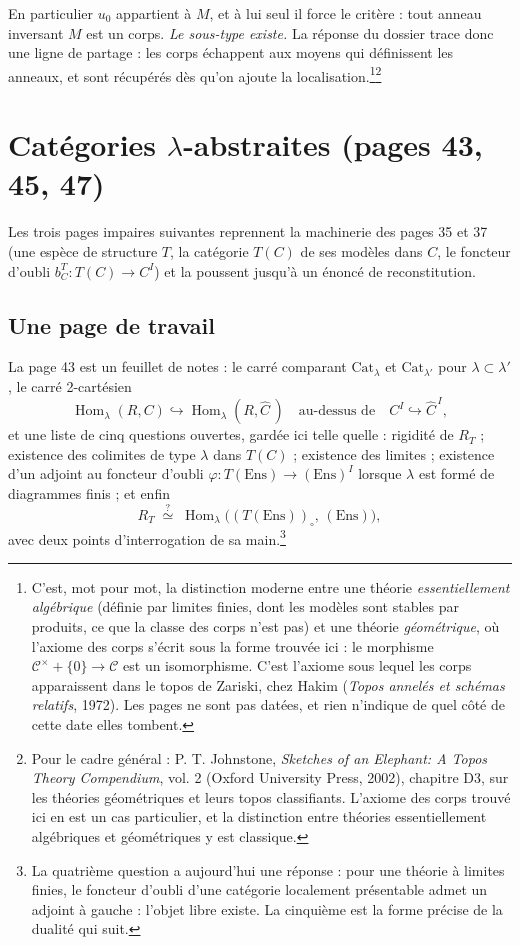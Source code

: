 \documentclass[11pt,a4paper]{article}
\begin{document}
En particulier $u_{0}$ appartient à $M$, et à lui seul il force le critère :
tout anneau inversant $M$ est un corps. \emph{Le sous-type existe.} La réponse
du dossier trace donc une ligne de partage : les corps
échappent aux moyens qui définissent les anneaux, et sont récupérés dès qu'on
ajoute la localisation.\footnote{C'est, mot pour mot, la distinction moderne
entre une théorie \emph{essentiellement algébrique} (définie par limites
finies, dont les modèles sont stables par produits, ce que la classe des corps
n'est pas) et une théorie \emph{géométrique}, où l'axiome des corps s'écrit
sous la forme trouvée ici : le morphisme
$\mathcal{C}^{\times} + \{0\} \to \mathcal{C}$ est un isomorphisme. C'est
l'axiome sous lequel les corps apparaissent dans le topos de Zariski, chez
Hakim (\emph{Topos annelés et schémas relatifs}, 1972). Les pages ne sont pas
datées, et rien n'indique de quel côté de cette date elles tombent.}\footnote{Pour
le cadre général : P. T. Johnstone, \emph{Sketches of an Elephant: A Topos
Theory Compendium}, vol. 2 (Oxford University Press, 2002), chapitre D3, sur
les théories géométriques et leurs topos classifiants. L'axiome des corps
trouvé ici en est un cas particulier, et la distinction entre théories
essentiellement algébriques et géométriques y est classique.}

\section*{Catégories $\lambda$-abstraites (pages 43, 45, 47)}

Les trois pages impaires suivantes reprennent la machinerie des pages 35 et 37
(une espèce de structure $T$, la catégorie $T(C)$ de ses modèles dans $C$, le
foncteur d'oubli $b^{T}_{C} : T(C) \to C^{I}$) et la poussent jusqu'à un
énoncé de reconstitution.

\subsection*{Une page de travail}

La page 43 est un feuillet de notes : le carré comparant $\mathrm{Cat}_{\lambda}$
et $\mathrm{Cat}_{\lambda'}$ pour $\lambda \subset \lambda'$, le carré
2-cartésien
\[
\operatorname{Hom}_{\lambda}(R, C) \hookrightarrow
\operatorname{Hom}_{\lambda}(R, \widehat{C}\,)
\quad\text{au-dessus de}\quad
C^{I} \hookrightarrow \widehat{C}^{\,I},
\]
et une liste de cinq questions ouvertes, gardée ici telle quelle :
rigidité de $R_{T}$ ; existence des colimites de type $\lambda$ dans $T(C)$ ;
existence des limites ; existence d'un adjoint au foncteur d'oubli
$\varphi : T(\mathrm{Ens}) \to (\mathrm{Ens})^{I}$ lorsque $\lambda$ est formé
de diagrammes finis ; et enfin
\[
R_{T} \;\overset{?}{\simeq}\; \operatorname{Hom}_{\lambda}
\bigl((T(\mathrm{Ens}))_{\circ},\, (\mathrm{Ens})\bigr),
\]
avec deux points d'interrogation de sa main.\footnote{La quatrième question a
aujourd'hui une réponse : pour une théorie à limites finies, le foncteur
d'oubli d'une catégorie localement présentable admet un adjoint à gauche :
l'objet libre existe. La cinquième est la forme précise de la dualité qui suit.}
\end{document}
